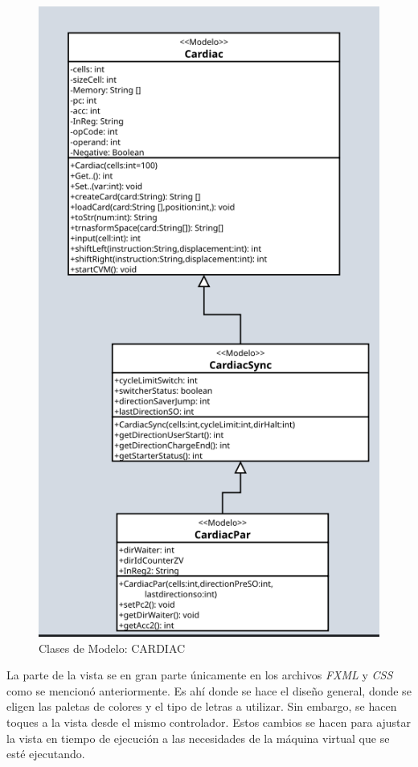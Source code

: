 \documentclass[letterpaper,12pt,oneside]{book}
\begin{document}
	\begin{figure}[h]		
				\centering
				\includegraphics[scale=0.6]{media/anexoSoftware/clasesModelo.png}
				\caption{Clases de Modelo: CARDIAC}
				\label{fig:modelo_clases_cardiac}
	\end{figure}	
	
	La parte de la vista se en gran parte únicamente en los archivos \textit{FXML} y \textit{CSS} como se mencionó anteriormente. Es ahí donde se hace
	el diseño general, donde se eligen las paletas de colores y el tipo de letras a utilizar. Sin embargo, se hacen toques a la vista desde
	el mismo controlador. Estos cambios se hacen para ajustar la vista en tiempo de ejecución a las necesidades de la máquina virtual que
	se esté ejecutando.
	
\end{document}
